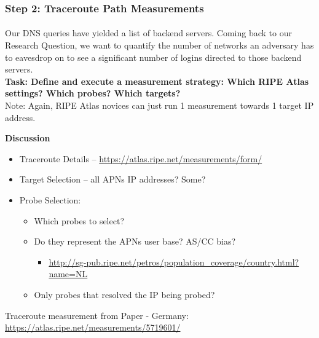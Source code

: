 \begin{frame}
\frametitle{Step 2: Traceroute Path Measurements}
\framesubtitle{}
Our DNS queries have yielded a list of backend servers. Coming back to our Research Question, we want to quantify the number of networks an adversary has to eavesdrop on to see a significant number of logins directed to those backend servers. \\
\textbf{Task: Define and execute a measurement strategy: Which RIPE Atlas settings? Which probes? Which targets?}\\
Note: Again, RIPE Atlas novices can just run 1 measurement towards 1 target IP address.

\pause
\textbf{Discussion}
\begin{itemize}
	\item Traceroute Details -- \url{https://atlas.ripe.net/measurements/form/}
	\item Target Selection -- all APNs IP addresses? Some? 
	\item Probe Selection:
	\begin{itemize}
		\item Which probes to select?
		\item Do they represent the APNs user base? AS/CC bias?
		\begin{itemize}
			\item  \hyperlink{NL example}{\url{http://sg-pub.ripe.net/petros/population_coverage/country.html?name=NL}}
		\end{itemize}
		\item Only probes that resolved the IP being probed?
	\end{itemize}
\end{itemize}

Traceroute measurement from Paper - Germany: \url{https://atlas.ripe.net/measurements/5719601/}
\end{frame}
\clearpage
